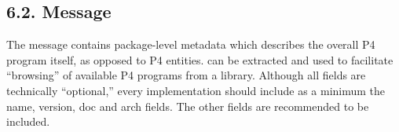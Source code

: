 \documentclass[11pt]{article}
\begin{document}
{%
\subsection{6.2.\hspace*{0.5em} Message}\label{sec-pkginfo-message}%

\noindent{}The  message contains package-level metadata which describes the
overall P4 program itself, as opposed to P4 entities.  can be extracted
and used to facilitate \textquotedblleft{}browsing\textquotedblright{} of available P4 programs from a
library. Although all fields are technically \textquotedblleft{}optional,\textquotedblright{} every implementation
should include as a minimum the name, version, doc and arch fields. The other
fields are recommended to be included.%

}
\end{document}
